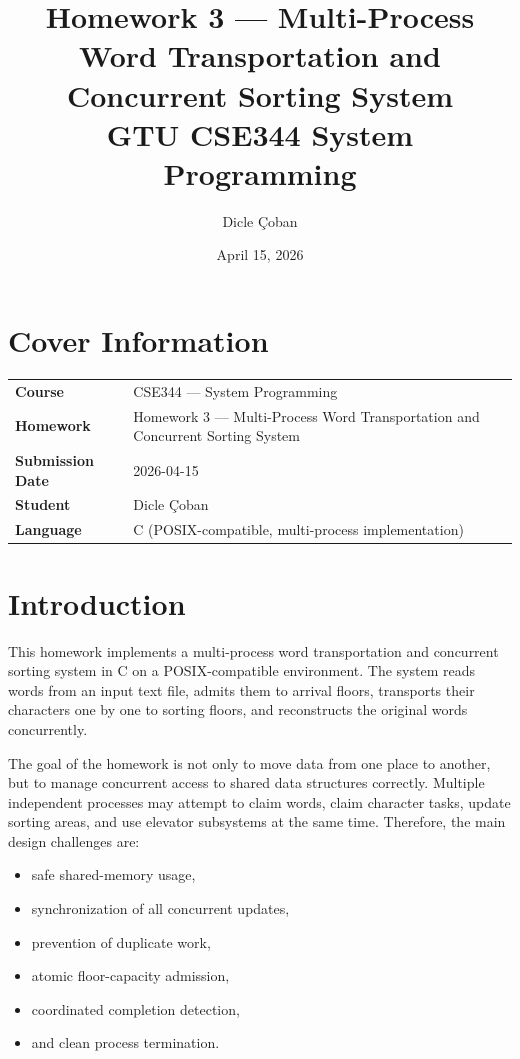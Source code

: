 \documentclass[12pt,a4paper]{article}
\title{\textbf{Homework 3 --- Multi-Process Word Transportation and Concurrent Sorting System}\\
GTU CSE344 System Programming}
\author{Dicle Çoban}
\date{April 15, 2026}
\begin{document}
\maketitle
\thispagestyle{empty}

\section*{Cover Information}

\begin{tabularx}{\textwidth}{>{\bfseries}l X}
Course & CSE344 --- System Programming \\
Homework & Homework 3 --- Multi-Process Word Transportation and Concurrent Sorting System \\
Submission Date & 2026-04-15 \\
Student & Dicle Çoban \\
Language & C (POSIX-compatible, multi-process implementation) \\
\end{tabularx}

\vspace{1em}

\section{Introduction}

This homework implements a multi-process word transportation and concurrent sorting system in C on a POSIX-compatible environment. The system reads words from an input text file, admits them to arrival floors, transports their characters one by one to sorting floors, and reconstructs the original words concurrently.

The goal of the homework is not only to move data from one place to another, but to manage concurrent access to shared data structures correctly. Multiple independent processes may attempt to claim words, claim character tasks, update sorting areas, and use elevator subsystems at the same time. Therefore, the main design challenges are:

\begin{itemize}[leftmargin=1.5em]
\item safe shared-memory usage,
\item synchronization of all concurrent updates,
\item prevention of duplicate work,
\item atomic floor-capacity admission,
\item coordinated completion detection,
\item and clean process termination.
\end{itemize}
\end{document}
